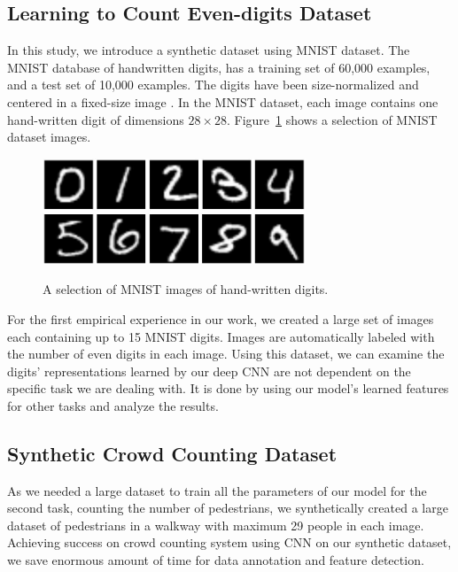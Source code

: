 \subsection{Learning to Count Even-digits Dataset}

In this study, we introduce a synthetic dataset using MNIST dataset. The MNIST database of handwritten digits, has a training set of 60,000 examples, and a test set of 10,000 examples. The digits have been size-normalized and centered in a fixed-size image \cite{lecun1999mnist}. In the MNIST dataset, each image contains one hand-written digit of dimensions $28\times28$. Figure~\ref{fig:mnistimages} shows a selection of MNIST dataset images.

\begin{figure}[H]
	\centering
	{\includegraphics[width=0.7\textwidth]{images/mnistall}}
	\caption{A selection of MNIST images of hand-written digits.}
	\label{fig:mnistimages}
\end{figure}


\noindent For the first empirical experience in our work, we created a large set of images each containing up to 15 MNIST digits. Images are automatically labeled with the number of even digits in each image. Using this dataset, we can examine the digits' representations learned by our deep CNN are not dependent on the specific task we are dealing with. It is done by using our model's learned features for other tasks and analyze the results. 

\subsection{Synthetic Crowd Counting Dataset}

As we needed a large dataset to train all the parameters of our model for the second task, counting the number of pedestrians, we synthetically created a large dataset of pedestrians in a walkway with maximum 29 people in each image. Achieving success on crowd counting system using CNN on our synthetic dataset, we save enormous amount of time for data annotation and feature detection. 

